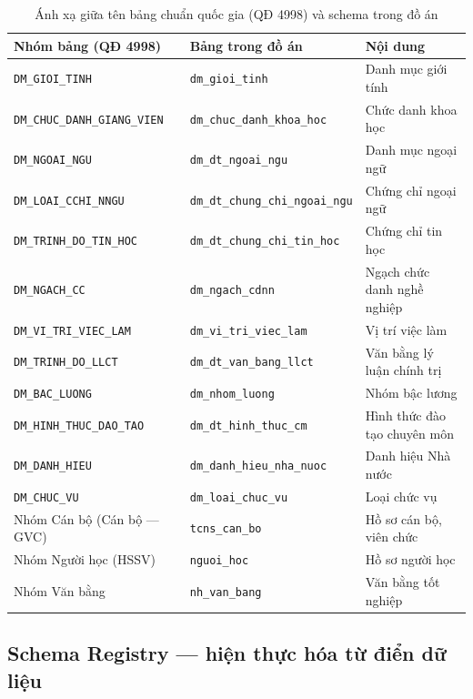 \begin{table}[H]
\centering
\renewcommand{\arraystretch}{1.4}
\begin{tabularx}{\textwidth}{|l|l|X|}
\hline
\textbf{Nhóm bảng (QĐ 4998)} & \textbf{Bảng trong đồ án} & \textbf{Nội dung} \\
\hline
\texttt{DM\_GIOI\_TINH} & \texttt{dm\_gioi\_tinh} & Danh mục giới tính \\
\hline
\texttt{DM\_CHUC\_DANH\_GIANG\_VIEN} & \texttt{dm\_chuc\_danh\_khoa\_hoc} & Chức danh khoa học \\
\hline
\texttt{DM\_NGOAI\_NGU} & \texttt{dm\_dt\_ngoai\_ngu} & Danh mục ngoại ngữ \\
\hline
\texttt{DM\_LOAI\_CCHI\_NNGU} & \texttt{dm\_dt\_chung\_chi\_ngoai\_ngu} & Chứng chỉ ngoại ngữ \\
\hline
\texttt{DM\_TRINH\_DO\_TIN\_HOC} & \texttt{dm\_dt\_chung\_chi\_tin\_hoc} & Chứng chỉ tin học \\
\hline
\texttt{DM\_NGACH\_CC} & \texttt{dm\_ngach\_cdnn} & Ngạch chức danh nghề nghiệp \\
\hline
\texttt{DM\_VI\_TRI\_VIEC\_LAM} & \texttt{dm\_vi\_tri\_viec\_lam} & Vị trí việc làm \\
\hline
\texttt{DM\_TRINH\_DO\_LLCT} & \texttt{dm\_dt\_van\_bang\_llct} & Văn bằng lý luận chính trị \\
\hline
\texttt{DM\_BAC\_LUONG} & \texttt{dm\_nhom\_luong} & Nhóm bậc lương \\
\hline
\texttt{DM\_HINH\_THUC\_DAO\_TAO} & \texttt{dm\_dt\_hinh\_thuc\_cm} & Hình thức đào tạo chuyên môn \\
\hline
\texttt{DM\_DANH\_HIEU} & \texttt{dm\_danh\_hieu\_nha\_nuoc} & Danh hiệu Nhà nước \\
\hline
\texttt{DM\_CHUC\_VU} & \texttt{dm\_loai\_chuc\_vu} & Loại chức vụ \\
\hline
Nhóm Cán bộ (Cán bộ — GVC) & \texttt{tcns\_can\_bo} & Hồ sơ cán bộ, viên chức \\
\hline
Nhóm Người học (HSSV) & \texttt{nguoi\_hoc} & Hồ sơ người học \\
\hline
Nhóm Văn bằng & \texttt{nh\_van\_bang} & Văn bằng tốt nghiệp \\
\hline
\end{tabularx}
\caption{Ánh xạ giữa tên bảng chuẩn quốc gia (QĐ 4998) và schema trong đồ án}
\label{tab:schema-mapping}
\end{table}

\subsection{Schema Registry — hiện thực hóa từ điển dữ liệu}

